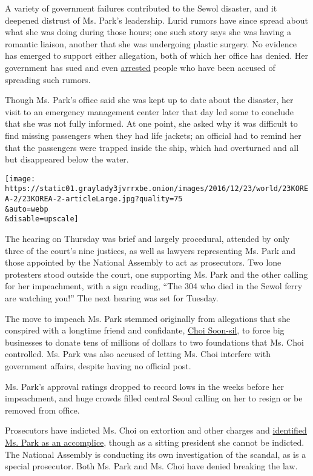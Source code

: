 A variety of government failures contributed to the Sewol disaster, and
it deepened distrust of Ms. Park's leadership. Lurid rumors have since
spread about what she was doing during those hours; one such story says
she was having a romantic liaison, another that she was undergoing
plastic surgery. No evidence has emerged to support either allegation,
both of which her office has denied. Her government has sued and even
\href{https://www.nytimes3xbfgragh.onion/2014/10/10/world/asia/japan-protests-an-indictment-of-a-journalist-.html}{arrested}
people who have been accused of spreading such rumors.

Though Ms. Park's office said she was kept up to date about the
disaster, her visit to an emergency management center later that day led
some to conclude that she was not fully informed. At one point, she
asked why it was difficult to find missing passengers when they had life
jackets; an official had to remind her that the passengers were trapped
inside the ship, which had overturned and all but disappeared below the
water.

\texttt{[image: https://static01.graylady3jvrrxbe.onion/images/2016/12/23/world/23KOREA-2/23KOREA-2-articleLarge.jpg?quality=75\\\&auto=webp\\\&disable=upscale]}

The hearing on Thursday was brief and largely procedural, attended by
only three of the court's nine justices, as well as lawyers representing
Ms. Park and those appointed by the National Assembly to act as
prosecutors. Two lone protesters stood outside the court, one supporting
Ms. Park and the other calling for her impeachment, with a sign reading,
``The 304 who died in the Sewol ferry are watching you!'' The next
hearing was set for Tuesday.

The move to impeach Ms. Park stemmed originally from allegations that
she conspired with a longtime friend and confidante,
\href{http://www.nytimes3xbfgragh.onion/2016/11/01/world/asia/south-korea-park-geun-hye-choi-soon-sil.html}{Choi
Soon-sil}, to force big businesses to donate tens of millions of dollars
to two foundations that Ms. Choi controlled. Ms. Park was also accused
of letting Ms. Choi interfere with government affairs, despite having no
official post.

Ms. Park's approval ratings dropped to record lows in the weeks before
her impeachment, and huge crowds filled central Seoul calling on her to
resign or be removed from office.

Prosecutors have indicted Ms. Choi on extortion and other charges and
\href{http://www.nytimes3xbfgragh.onion/2016/11/20/world/asia/park-geun-hye-south-korea-extortion-accomplice-prosecutors.html}{identified
Ms. Park as an accomplice}, though as a sitting president she cannot be
indicted. The National Assembly is conducting its own investigation of
the scandal, as is a special prosecutor. Both Ms. Park and Ms. Choi have
denied breaking the law.

